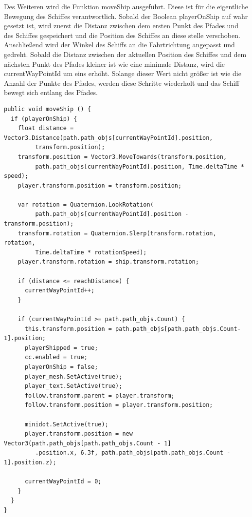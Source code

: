 			Des Weiteren wird die Funktion moveShip ausgeführt. Diese ist für die eigentliche Bewegung des Schiffes verantwortlich. Sobald der Boolean playerOnShip auf wahr gesetzt ist, wird zuerst die Distanz zwischen dem ersten Punkt des Pfades und des Schiffes gespeichert und die Position des Schiffes an diese stelle verschoben. Anschließend wird der Winkel des Schiffs an die Fahrtrichtung angepasst und gedreht. Sobald die Distanz zwischen der aktuellen Position des Schiffes und dem nächsten Punkt des Pfades kleiner ist wie eine minimale Distanz, wird die currentWayPointId um eins erhöht. Solange dieser Wert nicht größer ist wie die Anzahl der Punkte des Pfades, werden diese Schritte wiederholt und das Schiff bewegt sich entlang des Pfades.

\begin{scriptsize}
\lstset{
	float,
	caption=Methode: moveShip, 
	language=[Sharp]C, 
	frame=single,  
	showstringspaces=false, 
	showspaces=false, 
	numbers=left, 
	captionpos=b, 
	belowcaptionskip=4pt,
	basicstyle=\ttfamily
} 
\begin{lstlisting}[label=lst:methode2]
public void moveShip () {
  if (playerOnShip) {
    float distance = Vector3.Distance(path.path_objs[currentWayPointId].position, 
  	     transform.position);
    transform.position = Vector3.MoveTowards(transform.position, 
  	     path.path_objs[currentWayPointId].position, Time.deltaTime * speed);
    player.transform.position = transform.position;

    var rotation = Quaternion.LookRotation(
         path.path_objs[currentWayPointId].position - transform.position);
    transform.rotation = Quaternion.Slerp(transform.rotation, rotation, 
         Time.deltaTime * rotationSpeed);
    player.transform.rotation = ship.transform.rotation;

    if (distance <= reachDistance) {
      currentWayPointId++;
    }

    if (currentWayPointId >= path.path_objs.Count) {
      this.transform.position = path.path_objs[path.path_objs.Count-1].position;
      playerShipped = true;
      cc.enabled = true;
      playerOnShip = false;
      player_mesh.SetActive(true);
      player_text.SetActive(true);
      follow.transform.parent = player.transform;
      follow.transform.position = player.transform.position;

      minidot.SetActive(true);
      player.transform.position = new Vector3(path.path_objs[path.path_objs.Count - 1]
         .position.x, 6.3f, path.path_objs[path.path_objs.Count - 1].position.z);
                
      currentWayPointId = 0;
    }
  }
}
    
\end{lstlisting}
\end{scriptsize}
